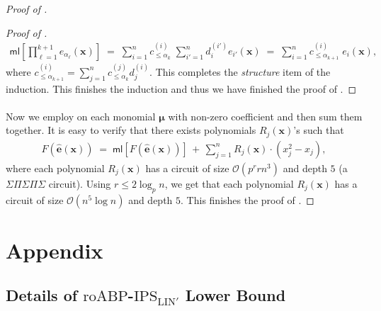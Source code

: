 \documentclass[11pt]{article}
\newcommand{\bigO}{\mathcal{O}}
\newcommand{\brac}[1]{\left[ #1 \right]}
\newcommand{\IPSLINp}{\mathrm{IPS}_{\mathrm{LIN}'}}
\newcommand{\roABP}{\mathrm{roABP}}
\newcommand{\ml}{\mathsf{ml}}
\begin{document}
\begin{proof}[Proof of ]
\begin{proof}[Proof of ]
\begin{align*}
    \ml\brac{\prod_{\ell = 1}^{k+1} e_{\alpha_{\ell}}(\mathbf{x})} \; = \; \sum_{i = 1}^{n} c_{\leq \alpha_{k}}^{(i)} \; \sum_{i'=1}^{n} d_{i}^{(i')} e_{i'}(\mathbf{x}) \; = \; \sum_{i = 1}^{n} c_{\leq \alpha_{k+1}}^{(i)} \; e_{i}(\mathbf{x}),
\end{align*}
where $c_{\leq \alpha_{k+1}}^{(i)} = \sum_{j=1}^{n} c_{\leq \alpha_{k}}^{(j)} d_{j}^{(i)}$. This completes the \emph{structure} item of the induction.\newline
This finishes the induction and thus we have finished the proof of .
\end{proof}

\paragraph{}Now we employ  on each monomial $\bm{\mu}$ with non-zero coefficient and then sum them together. It is easy to verify that there exists polynomials $R_{j}(\mathbf{x})$'s such that
\begin{align*}
    F(\widehat{\mathbf{e}}(\mathbf{x})) \; = \; \ml[F(\widehat{\mathbf{e}}(\mathbf{x}))] \, + \, \sum_{j=1}^{n} R_{j}(\mathbf{x}) \cdot (x_{j}^{2} - x_{j}),
\end{align*}
where each polynomial $R_{j}(\mathbf{x})$ has a circuit of size $\bigO(p^{r} r 
 n^{3})$ and depth $5$ (a $\Sigma \Pi \Sigma \Pi \Sigma$ circuit). Using $r \leq 2 \log_{p} n$, we get that each polynomial $R_{j}(\mathbf{x})$ has a circuit of size $\bigO(n^{5} \log n)$ and depth $5$. This finishes the proof of .
\end{proof}


\medskip

\printbibliography[
heading=bibintoc,
title={References}
]

\appendix



\section{Appendix}
\subsection{Details of $\roABP$-$\IPSLINp$ Lower Bound}
\end{document}
